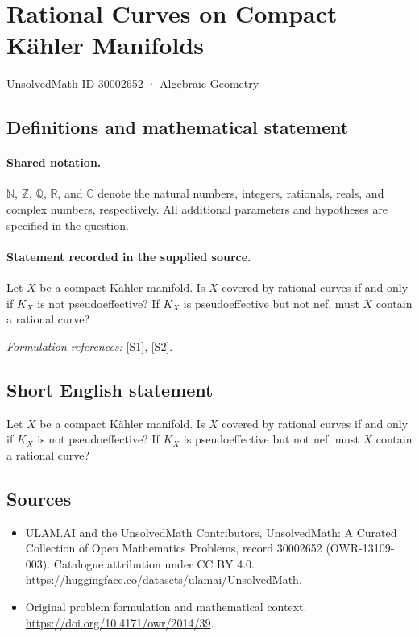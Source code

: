 \documentclass[11pt]{article}
\newcommand{\sref}[2]{\hyperlink{source:#1:#2}{[S#2]}}
\begin{document}
\setcounter{section}{30002651}
\section{Rational Curves on Compact Kähler Manifolds}\label{30002652}
{\small UnsolvedMath ID 30002652 · Algebraic Geometry}
\subsection{Definitions and mathematical statement}

\paragraph{Shared notation.}$\mathbb N$, $\mathbb Z$, $\mathbb Q$, $\mathbb R$, and $\mathbb C$ denote the natural numbers, integers, rationals, reals, and complex numbers, respectively. All additional parameters and hypotheses are specified in the question.


\paragraph{Statement recorded in the supplied source.}
Let $X$ be a compact Kähler manifold. Is $X$ covered by rational curves if and only if $K_X$ is not pseudoeffective? If $K_X$ is pseudoeffective but not nef, must $X$ contain a rational curve?
\par\smallskip\textit{Formulation references:} \sref{30002652}{1}, \sref{30002652}{2}.
\subsection{Short English statement}
Let $X$ be a compact Kähler manifold. Is $X$ covered by rational curves if and only if $K_X$ is not pseudoeffective? If $K_X$ is pseudoeffective but not nef, must $X$ contain a rational curve?
\subsection{Sources}
\begin{itemize}
\item[\hypertarget{source:30002652:1}{S1}] ULAM.AI and the UnsolvedMath Contributors, UnsolvedMath: A Curated Collection of Open Mathematics Problems, record 30002652 (OWR-13109-003). Catalogue attribution under CC BY 4.0.
\url{https://huggingface.co/datasets/ulamai/UnsolvedMath}.
\item[\hypertarget{source:30002652:2}{S2}] Original problem formulation and mathematical context.
\url{https://doi.org/10.4171/owr/2014/39}.
\end{itemize}
\label{end:30002652}
\end{document}
